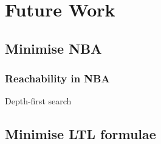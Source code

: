 \section{Future Work}
\subsection{Minimise NBA}
\cite{fritz2002state, hopcroft1971n, kan2016partial}
\subsubsection{Reachability in NBA}
Depth-first search
\subsection{Minimise LTL formulae}

